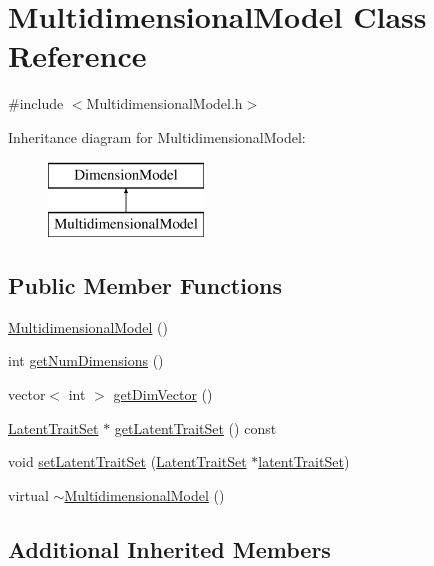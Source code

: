 \hypertarget{classMultidimensionalModel}{}\section{Multidimensional\+Model Class Reference}
\label{classMultidimensionalModel}


{\ttfamily \#include $<$Multidimensional\+Model.\+h$>$}

Inheritance diagram for Multidimensional\+Model\+:\begin{figure}[H]
\begin{center}
\leavevmode
\includegraphics[height=2.000000cm]{classMultidimensionalModel}
\end{center}
\end{figure}
\subsection*{Public Member Functions}
\begin{DoxyCompactItemize}
\item 
\hyperlink{classMultidimensionalModel_ab03d019127c672972165bef2495b603f}{Multidimensional\+Model} ()
\item 
int \hyperlink{classMultidimensionalModel_ad76fe466abfab3c05bb86519440d0302}{get\+Num\+Dimensions} ()
\item 
vector$<$ int $>$ \hyperlink{classMultidimensionalModel_a6834137ae4a9d43cd73cf31025258059}{get\+Dim\+Vector} ()
\item 
\hyperlink{classLatentTraitSet}{Latent\+Trait\+Set} $\ast$ \hyperlink{classMultidimensionalModel_a94d8dcb1f23f8fa8223ef7cc2d7f860d}{get\+Latent\+Trait\+Set} () const 
\item 
void \hyperlink{classMultidimensionalModel_a367cc1d66122b0f56293271a0ffd4859}{set\+Latent\+Trait\+Set} (\hyperlink{classLatentTraitSet}{Latent\+Trait\+Set} $\ast$\hyperlink{classDimensionModel_af202cd5a44ee99d865674c6e26d770c8}{latent\+Trait\+Set})
\item 
virtual \hyperlink{classMultidimensionalModel_ab5734ccfd3223dbeb8ef0ac1d9c334f2}{$\sim$\+Multidimensional\+Model} ()
\end{DoxyCompactItemize}
\subsection*{Additional Inherited Members}


